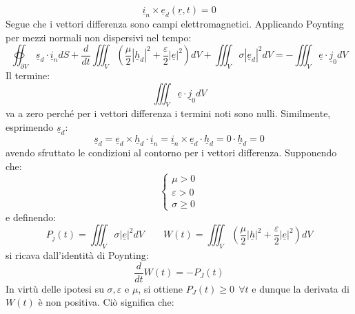 \documentclass{book}
\begin{document}
        \begin{equation}
            \underline{i}_{n} \times \underline{e}_{d}(\underline{r},t) = 0
        \end{equation}
        Segue che i vettori differenza sono campi elettromagnetici. Applicando Poynting per mezzi normali non dispersivi nel tempo:
        \begin{equation}
            \oiint_{\partial V} \underline{s}_{d} \cdot \underline{i}_{n} dS + \frac{d}{dt} \iiint_{V} (\frac{\mu}{2} |\underline{h}_{d}|^{2}+\frac{\varepsilon}{2}|\underline{e}|^{2})dV + \iiint_{V} \sigma |\underline{e}_{d}|^{2}dV = - \iiint_{V} \underline{e} \cdot \underline{j}_{0}dV
        \end{equation}
        Il termine:
        \begin{equation}
            \iiint_{V} \underline{e} \cdot \underline{j}_{0}dV
        \end{equation}
        va a zero perché per i vettori differenza i termini noti sono nulli. Similmente, esprimendo $\underline{s}_{d}$:
        \begin{equation}
            \underline{s}_{d} = \underline{e}_{d} \times \underline{h}_{d} \cdot \underline{i}_{n} = \underline{i}_{n} \times \underline{e}_{d} \cdot \underline{h}_{d} = 0 \cdot \underline{h}_{d} = 0
        \end{equation}
        avendo sfruttato le condizioni al contorno per i vettori differenza.
        Supponendo che:
        \begin{equation}
            \begin{cases}
                \mu > 0 \\
                \varepsilon > 0 \\
                \sigma \geq 0
            \end{cases}
        \end{equation}
        e definendo:
        \begin{equation}
            P_{j}(t) = \iiint_{V} \sigma |\underline{e}|^{2}dV \qquad W(t) = \iiint_{V} (\frac{\mu}{2}|\underline{h}|^{2}+\frac{\varepsilon}{2}|\underline{e}|^{2})dV
        \end{equation}
        si ricava dall'identità di Poynting:
        \begin{equation}
            \frac{d}{dt}W(t) = - P_{J}(t)
        \end{equation}
        In virtù delle ipotesi su $\sigma, \varepsilon$ e $\mu$, si ottiene $P_{J}(t) \geq 0 \ \ \forall t$ e dunque la derivata di $W(t)$ è non positiva. Ciò significa che:
\end{document}
